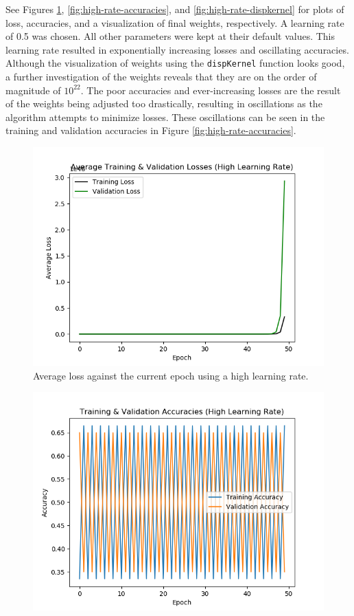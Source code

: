 \documentclass{article}
\begin{document}
\begin{enumerate}
        See Figures \ref{fig:high-rate-loss},
        \ref{fig:high-rate-accuracies}, and
        \ref{fig:high-rate-dispkernel}
        for plots of loss, accuracies, and a visualization of
        final weights, respectively. A learning rate of 0.5 was chosen. All other
        parameters were kept at their default values. This learning rate resulted in
        exponentially increasing losses and oscillating accuracies. Although the
        visualization of weights using the \texttt{dispKernel} function looks good,
        a further investigation of the weights reveals that they are on the order of
        magnitude of $10^{22}$. The poor accuracies and ever-increasing losses are the
        result of the weights being adjusted too drastically, resulting in oscillations
        as the algorithm attempts to minimize losses. These oscillations can be seen
        in the training and validation accuracies in Figure
        \ref{fig:high-rate-accuracies}.
        \begin{figure}[ht]
          \begin{center}
            \includegraphics[width=0.7\linewidth]{figures/high-rate-loss.png}
            \caption{Average loss against the current epoch using a high learning rate.}
            \label{fig:high-rate-loss}
          \end{center}
        \end{figure}
        \begin{figure}[ht]
          \begin{center}
            \includegraphics[width=0.7\linewidth]{figures/high-rate-accuracies.png}

\end{center}
\end{figure}
\end{enumerate}
\end{document}
